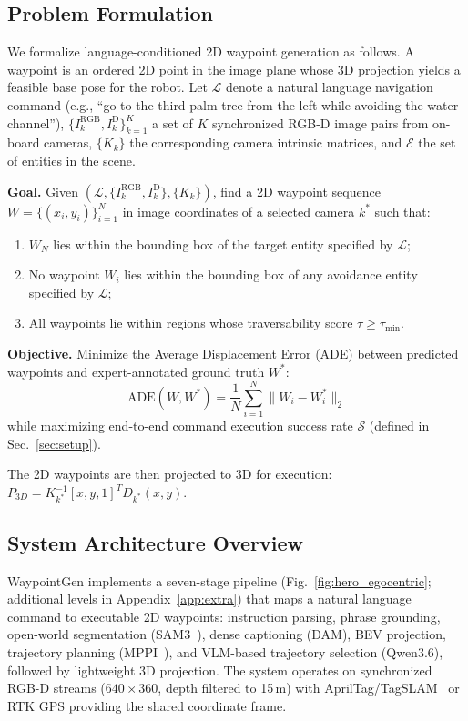 \documentclass{article}
\begin{document}
\subsection{Problem Formulation}
\label{sec:problem}

We formalize language-conditioned 2D waypoint generation as follows. A waypoint is an ordered 2D point in the image plane whose 3D projection yields a feasible base pose for the robot. Let $\mathcal{L}$ denote a natural language navigation command (e.g., ``go to the third palm tree from the left while avoiding the water channel''), $\{I_k^{\text{RGB}}, I_k^{\text{D}}\}_{k=1}^{K}$ a set of $K$ synchronized RGB-D image pairs from on-board cameras, $\{K_k\}$ the corresponding camera intrinsic matrices, and $\mathcal{E}$ the set of entities in the scene.

\textbf{Goal.} Given $(\mathcal{L}, \{I_k^{\text{RGB}}, I_k^{\text{D}}\}, \{K_k\})$, find a 2D waypoint sequence $W = \{(x_i, y_i)\}_{i=1}^{N}$ in image coordinates of a selected camera $k^*$ such that:
\begin{enumerate}
    \item $W_N$ lies within the bounding box of the target entity specified by $\mathcal{L}$;
    \item No waypoint $W_i$ lies within the bounding box of any avoidance entity specified by $\mathcal{L}$;
    \item All waypoints lie within regions whose traversability score $\tau \geq \tau_{\min}$.
\end{enumerate}

\textbf{Objective.} Minimize the Average Displacement Error (ADE) between predicted waypoints and expert-annotated ground truth $W^*$:
\begin{equation}
\text{ADE}(W, W^*) = \frac{1}{N}\sum_{i=1}^{N} \| W_i - W^*_i \|_2
\end{equation}
while maximizing end-to-end command execution success rate $\mathcal{S}$ (defined in Sec.~\ref{sec:setup}).

The 2D waypoints are then projected to 3D for execution: $P_{3D} = K_{k^*}^{-1} [x, y, 1]^T D_{k^*}(x,y)$.

\subsection{System Architecture Overview}

WaypointGen implements a seven-stage pipeline (Fig.~\ref{fig:hero_egocentric}; additional levels in Appendix~\ref{app:extra}) that maps a natural language command to executable 2D waypoints: instruction parsing, phrase grounding, open-world segmentation (SAM3~\citep{carion2025sam3}), dense captioning (DAM), BEV projection, trajectory planning (MPPI~\citep{williams2017mppi}), and VLM-based trajectory selection (Qwen3.6), followed by lightweight 3D projection. The system operates on synchronized RGB-D streams ($640{\times}360$, depth filtered to 15\,m) with AprilTag/TagSLAM~\citep{pfrommer2019tagslam} or RTK GPS providing the shared coordinate frame.
\end{document}
